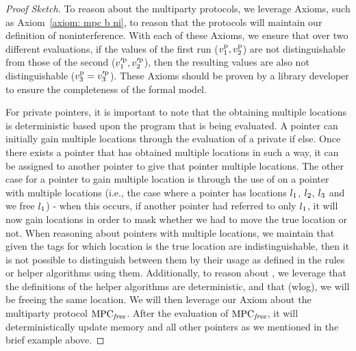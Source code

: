 \begin{proof}[Proof Sketch]
To reason about the multiparty protocols, we leverage Axioms, such as Axiom~\ref{axiom: mpc b ni}, to reason that the protocols will maintain our definition of noninterference. With each of these Axioms, we ensure that over two different evaluations, if the values of the first run ($v^{\mathrm{{p}}}_1, v^{\mathrm{{p}}}_2$) are not distinguishable from those of the second ($v'^{\mathrm{{p}}}_1, v'^{\mathrm{{p}}}_2$), then the resulting values are also not distinguishable ($v^{\mathrm{{p}}}_3 = v'^{\mathrm{{p}}}_3$). These Axioms should be proven by a library developer to ensure the completeness of the formal model. 

For private pointers, it is important to note that the obtaining multiple locations is deterministic based upon the program that is being evaluated. A pointer can initially gain multiple locations through the evaluation of a private if else. Once there exists a pointer that has obtained multiple locations in such a way, it can be assigned to another pointer to give that pointer multiple locations. The other case for a pointer to gain multiple location is through the use of  on a pointer with multiple locations (i.e., the case where a pointer has locations $l_1$, $l_2$, $l_3$ and we free $l_1$) - when this occurs, if another pointer had referred to only $l_1$, it will now gain locations in order to mask whether we had to move the true location or not. 
When reasoning about pointers with multiple locations, we maintain that given the tags for which location is the true location are indistinguishable, then it is not possible to distinguish between them by their usage as defined in the rules or helper algorithms using them. 
Additionally, to reason about , we leverage that the definitions of the helper algorithms are deterministic, and that (wlog), we will be freeing the same location. We will then leverage our Axiom about the multiparty protocol $\mathrm{MPC}_\mathit{{free}}$. After the evaluation of $\mathrm{MPC}_\mathit{{free}}$, it will deterministically update memory and all other pointers as we mentioned in the brief example above.


\end{proof}
